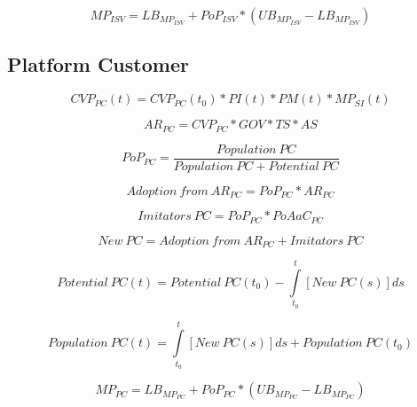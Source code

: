 \begin{equation}\label{eq:mp:isv}
	MP_{ISV} = LB_{MP_{ISV}} + PoP_{ISV} * (UB_{MP_{ISV}} - LB_{MP_{ISV}})
\end{equation}

\subsection{Platform Customer}\label{ch:app04:csf:pc}

\begin{equation}
		CVP_ {PC}(t) =  CVP_{PC}(t_0) * PI(t) * PM(t) * MP_{SI}(t)
\end{equation}

\begin{equation}
		AR_{PC} = CVP_{PC} * GOV * TS * AS		
\end{equation}

\begin{equation}
	PoP_{PC} = \frac{\mathit{Population~PC}}{\mathit{Population~PC}+\mathit{Potential~PC}}
\end{equation}

\begin{equation}
	\mathit{Adoption~from~AR_{PC}} = PoP_{PC} * AR_{PC}
\end{equation}

\begin{equation}
	\mathit{Imitators~PC} = PoP_{PC} * PoAaC_{PC}
\end{equation}

\begin{equation}
	\mathit{New~PC} = \mathit{Adoption~from~AR_{PC}} + \mathit{Imitators~PC}
\end{equation}

\begin{equation}
	\mathit{Potential~PC(t)} =\mathit{Potential~PC(t_0)} - \int\limits_{t_0}^t  [\mathit{New~PC}(s)]ds
\end{equation}

\begin{equation}
	\mathit{Population~PC(t)} = \int\limits_{t_0}^t [\mathit{New~PC}(s)]ds + \mathit{Population~PC(t_0)}
\end{equation}

\begin{equation}
	MP_{PC} = LB_{MP_{PC}} + PoP_{PC} * (UB_{MP_{PC}} - LB_{MP_{PC}})
\end{equation}


